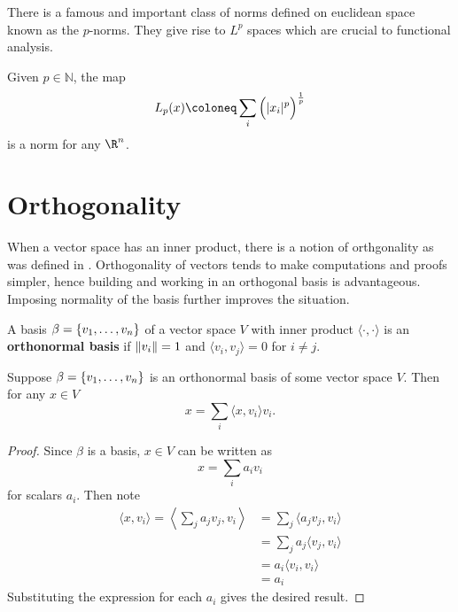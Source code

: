 \documentclass{subfiles}
\begin{document}
There is a famous and important class of norms defined on euclidean space known as the $p$-norms. They give rise to $L^p$ spaces which are crucial to functional analysis.

\begin{definition}[$L_p$ Norm]
    Given $p \in \mathbb{N}$, the map
    \[
        L_p(x) \coloneq \sum_{i} \qty\Big(|x_i|^p)^\frac{1}{p}
    \]
    is a norm for any $\R^n$.
\end{definition}

\chapter{Orthogonality}

When a vector space has an inner product, there is a notion of orthgonality as was defined in . Orthogonality of vectors tends to make computations and proofs simpler, hence building and working in an orthogonal basis is advantageous. Imposing normality of the basis further improves the situation.

\begin{definition}
    A basis $\beta = \qty{v_1, \ldots, v_n}$ of a vector space $V$ with inner product $\langle \cdot, \cdot \rangle$ is an \textbf{orthonormal basis} if $\norm{v_i} = 1$ and $\langle v_i, v_j \rangle = 0$ for $i \neq j$.
\end{definition}

\begin{theorem}
    Suppose $\beta = \qty{v_1, \ldots, v_n}$ is an orthonormal basis of some vector space $V$. Then for any $x \in V$
    \[
        x = \sum_{i} \langle x, v_i \rangle v_i
    .\]
\end{theorem}

\begin{proof}
    Since $\beta$ is a basis, $x \in V$ can be written as
    \[
        x = \sum_{i} a_i v_i
    \]
    for scalars $a_i$. Then note
    \begin{align*}
        \langle x, v_i \rangle = \left\langle \sum_{j} a_j v_j, v_i \right\rangle &= \sum_{j} \langle a_j v_j, v_i \rangle \\
        &= \sum_j a_j \langle v_j, v_i \rangle \\
        &= a_i \langle v_i, v_i \rangle \\
        &= a_i
    \end{align*}
     Substituting the expression for each $a_i$ gives the desired result.
\end{proof}
\end{document}
